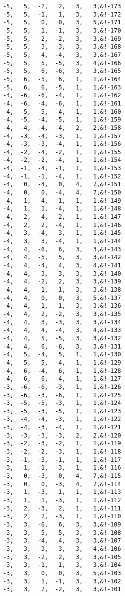 \begin{Verbatim}
 -5,   5,  -2,   2,   3,   3,&!-173
 -5,   5,  -1,   1,   3,   3,&!-172
 -5,   5,   0,   0,   3,   5,&!-171
 -5,   5,   1,  -1,   3,   3,&!-170
 -5,   5,   2,  -2,   3,   3,&!-169
 -5,   5,   3,  -3,   3,   3,&!-168
 -5,   5,   4,  -4,   3,   3,&!-167
 -5,   5,   5,  -5,   3,   4,&!-166
 -5,   5,   6,  -6,   3,   3,&!-165
 -5,   6,  -5,   6,   1,   1,&!-164
 -5,   6,   6,  -5,   1,   1,&!-163
 -4,  -6,  -6,  -4,   1,   1,&!-162
 -4,  -6,  -4,  -6,   1,   1,&!-161
 -4,  -5,  -5,  -4,   1,   1,&!-160
 -4,  -5,  -4,  -5,   1,   1,&!-159
 -4,  -4,  -4,  -4,   2,   2,&!-158
 -4,  -3,  -4,  -3,   1,   1,&!-157
 -4,  -3,  -3,  -4,   1,   1,&!-156
 -4,  -2,  -4,  -2,   1,   1,&!-155
 -4,  -2,  -2,  -4,   1,   1,&!-154
 -4,  -1,  -4,  -1,   1,   1,&!-153
 -4,  -1,  -1,  -4,   1,   1,&!-152
 -4,   0,  -4,   0,   4,   7,&!-151
 -4,   0,   0,  -4,   4,   7,&!-150
 -4,   1,  -4,   1,   1,   1,&!-149
 -4,   1,   1,  -4,   1,   1,&!-148
 -4,   2,  -4,   2,   1,   1,&!-147
 -4,   2,   2,  -4,   1,   1,&!-146
 -4,   3,  -4,   3,   1,   1,&!-145
 -4,   3,   3,  -4,   1,   1,&!-144
 -4,   4,  -6,   6,   3,   3,&!-143
 -4,   4,  -5,   5,   3,   3,&!-142
 -4,   4,  -4,   4,   3,   4,&!-141
 -4,   4,  -3,   3,   3,   3,&!-140
 -4,   4,  -2,   2,   3,   3,&!-139
 -4,   4,  -1,   1,   3,   3,&!-138
 -4,   4,   0,   0,   3,   5,&!-137
 -4,   4,   1,  -1,   3,   3,&!-136
 -4,   4,   2,  -2,   3,   3,&!-135
 -4,   4,   3,  -3,   3,   3,&!-134
 -4,   4,   4,  -4,   3,   4,&!-133
 -4,   4,   5,  -5,   3,   3,&!-132
 -4,   4,   6,  -6,   3,   3,&!-131
 -4,   5,  -4,   5,   1,   1,&!-130
 -4,   5,   5,  -4,   1,   1,&!-129
 -4,   6,  -4,   6,   1,   1,&!-128
 -4,   6,   6,  -4,   1,   1,&!-127
 -3,  -6,  -6,  -3,   1,   1,&!-126
 -3,  -6,  -3,  -6,   1,   1,&!-125
 -3,  -5,  -5,  -3,   1,   1,&!-124
 -3,  -5,  -3,  -5,   1,   1,&!-123
 -3,  -4,  -4,  -3,   1,   1,&!-122
 -3,  -4,  -3,  -4,   1,   1,&!-121
 -3,  -3,  -3,  -3,   2,   2,&!-120
 -3,  -2,  -3,  -2,   1,   1,&!-119
 -3,  -2,  -2,  -3,   1,   1,&!-118
 -3,  -1,  -3,  -1,   1,   1,&!-117
 -3,  -1,  -1,  -3,   1,   1,&!-116
 -3,   0,  -3,   0,   4,   7,&!-115
 -3,   0,   0,  -3,   4,   7,&!-114
 -3,   1,  -3,   1,   1,   1,&!-113
 -3,   1,   1,  -3,   1,   1,&!-112
 -3,   2,  -3,   2,   1,   1,&!-111
 -3,   2,   2,  -3,   1,   1,&!-110
 -3,   3,  -6,   6,   3,   3,&!-109
 -3,   3,  -5,   5,   3,   3,&!-108
 -3,   3,  -4,   4,   3,   3,&!-107
 -3,   3,  -3,   3,   3,   4,&!-106
 -3,   3,  -2,   2,   3,   3,&!-105
 -3,   3,  -1,   1,   3,   3,&!-104
 -3,   3,   0,   0,   3,   5,&!-103
 -3,   3,   1,  -1,   3,   3,&!-102
 -3,   3,   2,  -2,   3,   3,&!-101

\end{Verbatim}
